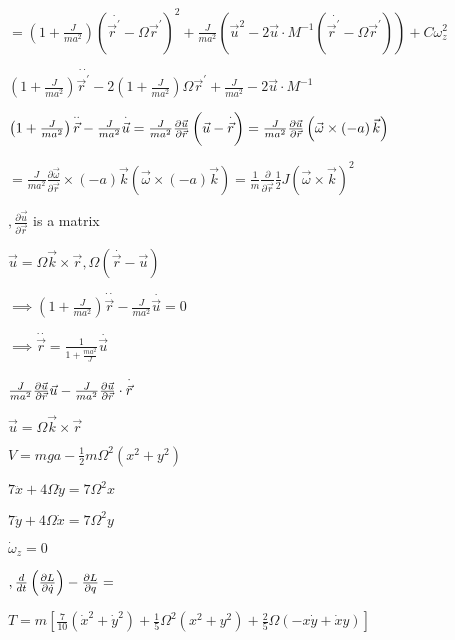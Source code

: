 \documentclass{article}
\def\QTP#1{}
\begin{document}
$=\left( 1+\frac{J}{ma^{2}}\right) \left( \overset{\cdot }{\vec{r}^{\prime }}%
-\Omega \vec{r}^{\prime }\right) ^{2}+\frac{J}{ma^{2}}\left( \vec{u}^{2}-2%
\vec{u}\cdot M^{-1}\left( \overset{\cdot }{\vec{r}^{\prime }}-\Omega \vec{r}%
^{\prime }\right) \right) +C\omega _{z}^{2}$

$\left( 1+\frac{J}{ma^{2}}\right) \overset{\cdot \cdot }{\vec{r}^{\prime }}%
-2\left( 1+\frac{J}{ma^{2}}\right) \Omega \vec{r}^{\prime }+\frac{J}{ma^{2}}%
-2\vec{u}\cdot M^{-1}$

$\left( 1+\frac{J}{ma^{2}}\right) \overset{\cdot \cdot }{\vec{r}}-\frac{J}{%
ma^{2}}\overset{\cdot }{\vec{u}}=\frac{J}{ma^{2}}\frac{\partial \vec{u}}{%
\partial \vec{r}}\left( \vec{u}-\overset{\cdot }{\vec{r}}\right) =\frac{J}{%
ma^{2}}\frac{\partial \vec{u}}{\partial \vec{r}}\left( \vec{\omega}\times
\left( -a\right) \vec{k}\right) $

$=\frac{J}{ma^{2}}\frac{\partial \vec{\omega}}{\partial \vec{r}}\times
\left( -a\right) \vec{k}\left( \vec{\omega}\times \left( -a\right) \vec{k}%
\right) =\frac{1}{m}\frac{\partial }{\partial \vec{r}}\frac{1}{2}J\left( 
\vec{\omega}\times \vec{k}\right) ^{2}$

$,\frac{\partial \vec{u}}{\partial \vec{r}}$ is a matrix 

$\vec{u}=\Omega \vec{k}\times \vec{r},\Omega \left( \overset{\cdot }{\vec{r}}%
-\vec{u}\right) $

$\implies \left( 1+\frac{J}{ma^{2}}\right) \overset{\cdot \cdot }{\vec{r}}-%
\frac{J}{ma^{2}}\overset{\cdot }{\vec{u}}=0$

$\implies \overset{\cdot \cdot }{\vec{r}}=\frac{1}{1+\frac{ma^{2}}{J}}%
\overset{\cdot }{\vec{u}}$

$\frac{J}{ma^{2}}\frac{\partial \vec{u}}{\partial \vec{r}}\vec{u}-\frac{J}{%
ma^{2}}\frac{\partial \vec{u}}{\partial \vec{r}}\cdot \overset{\cdot }{\vec{r%
}}$

$\vec{u}=\Omega \vec{k}\times \vec{r}$

\QTP{Body Math}
$V=mga-\frac{1}{2}m\Omega ^{2}\left( x^{2}+y^{2}\right) $

\QTP{Body Math}
$7\ddot{x}+4\Omega \dot{y}=7\Omega ^{2}x$

\QTP{Body Math}
$7\ddot{y}+4\Omega \dot{x}=7\Omega ^{2}y$

\QTP{Body Math}
$\dot{\omega}_{z}=0$

\QTP{Body Math}
$,\frac{d}{dt}\left( \frac{\partial L}{\partial \dot{q}}\right) -\frac{%
\partial L}{\partial q}=$

$T=m\left[ \frac{7}{10}\left( \dot{x}^{2}+\dot{y}^{2}\right) +\frac{1}{5}%
\Omega ^{2}\left( x^{2}+y^{2}\right) +\frac{2}{5}\Omega \left( -x\dot{y}+%
\dot{x}y\right) \right] $
\end{document}
